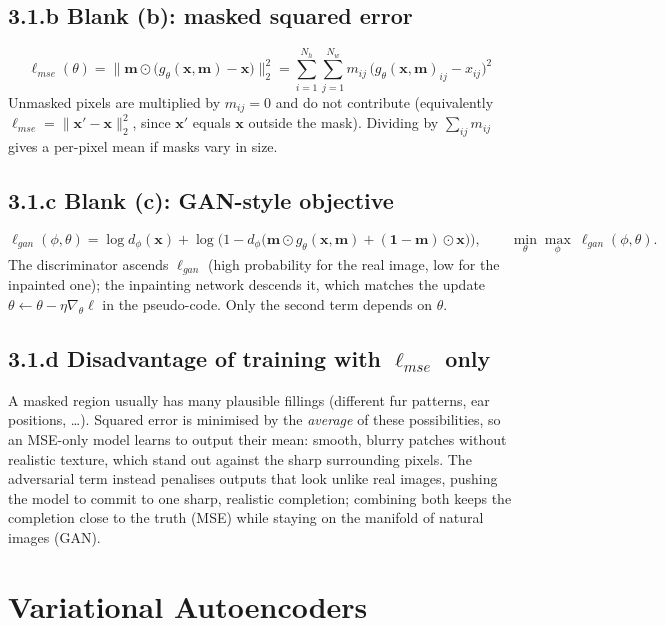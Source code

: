 \documentclass[11pt,a4paper]{article}
\newcommand{\x}{\mathbf{x}}
\begin{document}
\subsection*{3.1.b Blank (b): masked squared error}
\[
\ell_{mse}(\theta) = \big\lVert \mathbf{m}\odot\big(g_\theta(\x,\mathbf{m})-\x\big)\big\rVert_2^2
= \sum_{i=1}^{N_h}\sum_{j=1}^{N_w} m_{ij}\,\big(g_\theta(\x,\mathbf{m})_{ij}-x_{ij}\big)^2
\]
Unmasked pixels are multiplied by $m_{ij}=0$ and do not contribute (equivalently $\ell_{mse}=\lVert\x'-\x\rVert_2^2$, since $\x'$ equals $\x$ outside the mask). Dividing by $\sum_{ij}m_{ij}$ gives a per-pixel mean if masks vary in size.

\subsection*{3.1.c Blank (c): GAN-style objective}
\[
\ell_{gan}(\phi,\theta) = \log d_\phi(\x) + \log\Big(1-d_\phi\big(\mathbf{m}\odot g_\theta(\x,\mathbf{m})+(\mathbf{1}-\mathbf{m})\odot\x\big)\Big),
\qquad \min_\theta\max_\phi\ \ell_{gan}(\phi,\theta).
\]
The discriminator ascends $\ell_{gan}$ (high probability for the real image, low for the inpainted one); the inpainting network descends it, which matches the update $\theta\leftarrow\theta-\eta\nabla_\theta\ell$ in the pseudo-code. Only the second term depends on $\theta$.

\subsection*{3.1.d Disadvantage of training with $\ell_{mse}$ only}

A masked region usually has many plausible fillings (different fur patterns, ear positions, \dots). Squared error is minimised by the \emph{average} of these possibilities, so an MSE-only model learns to output their mean: smooth, blurry patches without realistic texture, which stand out against the sharp surrounding pixels. The adversarial term instead penalises outputs that look unlike real images, pushing the model to commit to one sharp, realistic completion; combining both keeps the completion close to the truth (MSE) while staying on the manifold of natural images (GAN).

\section{Variational Autoencoders}
\end{document}

